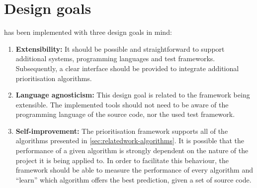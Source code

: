 
\section{Design goals}
\velocity{} has been implemented with three design goals in mind:
\begin{enumerate}
	\item \textbf{Extensibility:} It should be possible and straightforward to support additional \CI{} systems, programming languages and test frameworks. Subsequently, a clear interface should be provided to integrate additional prioritisation algorithms.
	
	\item \textbf{Language agnosticism:} This design goal is related to the framework being extensible. The implemented tools should not need to be aware of the programming language of the source code, nor the used test framework.
	
	\item \textbf{Self-improvement:} The prioritisation framework supports all of the algorithms presented in \autoref{sec:relatedwork-algorithms}. It is possible that the performance of a given algorithm is strongly dependent on the nature of the project it is being applied to. In order to facilitate this behaviour, the framework should be able to measure the performance of every algorithm and ``learn'' which algorithm offers the best prediction, given a set of source code.
\end{enumerate}